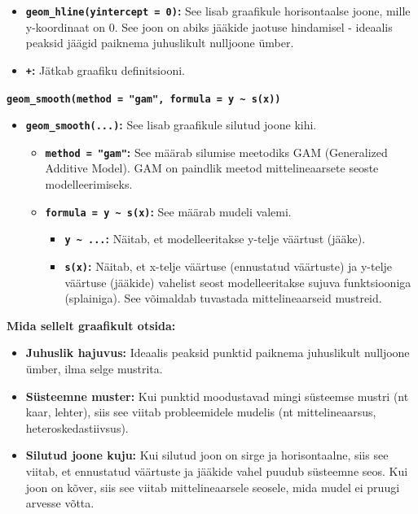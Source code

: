 \documentclass[
]{book}
\providecommand{\tightlist}{%
  \setlength{\itemsep}{0pt}\setlength{\parskip}{0pt}}
\theoremstyle{definition}
\theoremstyle{definition}
\theoremstyle{definition}
\theoremstyle{definition}
\theoremstyle{remark}
\begin{document}
\begin{itemize}
\tightlist
\item
  \textbf{\texttt{geom\_hline(yintercept\ =\ 0)}:} See lisab graafikule horisontaalse joone, mille y-koordinaat on 0. See joon on abiks jääkide jaotuse hindamisel - ideaalis peaksid jäägid paiknema juhuslikult nulljoone ümber.
\item
  \textbf{\texttt{+}:} Jätkab graafiku definitsiooni.
\end{itemize}

\textbf{\texttt{geom\_smooth(method\ =\ "gam",\ formula\ =\ y\ \textasciitilde{}\ s(x))}}

\begin{itemize}
\tightlist
\item
  \textbf{\texttt{geom\_smooth(...)}:} See lisab graafikule silutud joone kihi.

  \begin{itemize}
  \tightlist
  \item
    \textbf{\texttt{method\ =\ "gam"}:} See määrab silumise meetodiks GAM (Generalized Additive Model). GAM on paindlik meetod mittelineaarsete seoste modelleerimiseks.
  \item
    \textbf{\texttt{formula\ =\ y\ \textasciitilde{}\ s(x)}:} See määrab mudeli valemi.

    \begin{itemize}
    \tightlist
    \item
      \textbf{\texttt{y\ \textasciitilde{}\ ...}:} Näitab, et modelleeritakse y-telje väärtust (jääke).
    \item
      \textbf{\texttt{s(x)}:} Näitab, et x-telje väärtuse (ennustatud väärtuste) ja y-telje väärtuse (jääkide) vahelist seost modelleeritakse sujuva funktsiooniga (splainiga). See võimaldab tuvastada mittelineaarseid mustreid.
    \end{itemize}
  \end{itemize}
\end{itemize}

\textbf{Mida sellelt graafikult otsida:}

\begin{itemize}
\tightlist
\item
  \textbf{Juhuslik hajuvus:} Ideaalis peaksid punktid paiknema juhuslikult nulljoone ümber, ilma selge mustrita.
\item
  \textbf{Süsteemne muster:} Kui punktid moodustavad mingi süsteemse mustri (nt kaar, lehter), siis see viitab probleemidele mudelis (nt mittelineaarsus, heteroskedastiivsus).
\item
  \textbf{Silutud joone kuju:} Kui silutud joon on sirge ja horisontaalne, siis see viitab, et ennustatud väärtuste ja jääkide vahel puudub süsteemne seos. Kui joon on kõver, siis see viitab mittelineaarsele seosele, mida mudel ei pruugi arvesse võtta.
\end{itemize}
\end{document}
